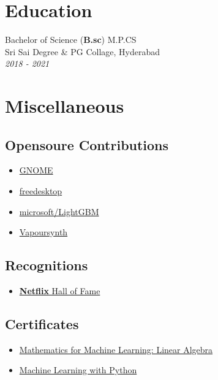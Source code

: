 \documentclass{article}
\begin{document}
\section{Education}
Bachelor of Science (\textbf{B.sc}) M.P.CS \\
Sri Sai Degree \& PG Collage, Hyderabad \\
\emph{2018 - 2021}



\section{Miscellaneous}


 \subsection{Opensoure Contributions}
 \begin{multicols}{2}
 \begin{itemize}
     \item \href{https://gitlab.gnome.org/jkotra}{GNOME}
     \item \href{https://gitlab.freedesktop.org/jkotra}{freedesktop}
     \item \href{https://github.com/microsoft/LightGBM}{microsoft/LightGBM}
     \item \href{https://github.com/vapoursynth/vapoursynth}{Vapoursynth}
 \end{itemize}
\end{multicols}

\subsection{Recognitions}

\begin{itemize}
    \item \href{https://bugcrowd.com/netflix/hall-of-fame}{\textbf{Netflix} Hall of Fame}
\end{itemize}


\subsection{Certificates}

\begin{itemize}
    \item \href{https://www.coursera.org/account/accomplishments/certificate/E2FE7HNXWP8J}{Mathematics for Machine Learning: Linear Algebra}
    \item \href{https://www.coursera.org/account/accomplishments/certificate/QDPTGAQSXZNM}{Machine Learning with Python}
\end{itemize}
\end{document}

